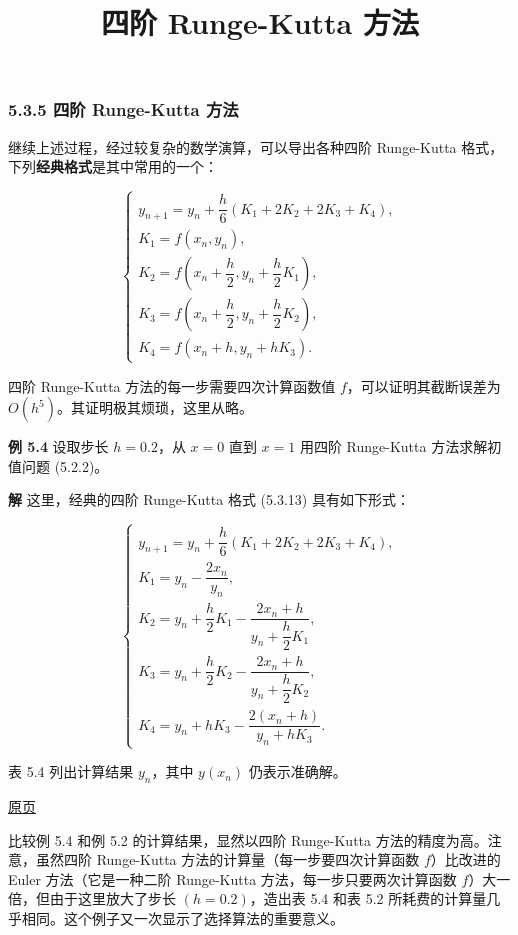 \documentclass[
  10pt,
  fontset=fandol]{ctexart}
\title{四阶 Runge-Kutta 方法}
\author{}
\date{}
\begin{document}
\maketitle

\subsubsection{5.3.5 四阶 Runge-Kutta 方法}\label{ux56dbux9636-runge-kutta-ux65b9ux6cd5}

继续上述过程，经过较复杂的数学演算，可以导出各种四阶 Runge-Kutta 格式，下列\textbf{经典格式}是其中常用的一个：

\[
\begin{cases}
y_{n+1}=y_n+\dfrac{h}{6}(K_1+2K_2+2K_3+K_4),\\
K_1=f(x_n,y_n),\\
K_2=f\left(x_n+\dfrac{h}{2},y_n+\dfrac{h}{2}K_1\right),\\
K_3=f\left(x_n+\dfrac{h}{2},y_n+\dfrac{h}{2}K_2\right),\\
K_4=f(x_n+h,y_n+hK_3).
\end{cases}\tag{5.3.13}
\]

四阶 Runge-Kutta 方法的每一步需要四次计算函数值 \(f\)，可以证明其截断误差为 \(O(h^5)\)。其证明极其烦琐，这里从略。

\textbf{例 5.4} 设取步长 \(h=0.2\)，从 \(x=0\) 直到 \(x=1\) 用四阶 Runge-Kutta 方法求解初值问题 (5.2.2)。

\textbf{解} 这里，经典的四阶 Runge-Kutta 格式 (5.3.13) 具有如下形式：

\[
\begin{cases}
y_{n+1}=y_n+\dfrac{h}{6}(K_1+2K_2+2K_3+K_4),\\
K_1=y_n-\dfrac{2x_n}{y_n},\\
K_2=y_n+\dfrac{h}{2}K_1-\dfrac{2x_n+h}{y_n+\dfrac{h}{2}K_1},\\
K_3=y_n+\dfrac{h}{2}K_2-\dfrac{2x_n+h}{y_n+\dfrac{h}{2}K_2},\\
K_4=y_n+hK_3-\dfrac{2(x_n+h)}{y_n+hK_3}.
\end{cases}
\]

表 5.4 列出计算结果 \(y_n\)，其中 \(y(x_n)\) 仍表示准确解。

\href{../../source-images/pdf-132.jpeg}{原页}

比较例 5.4 和例 5.2 的计算结果，显然以四阶 Runge-Kutta 方法的精度为高。注意，虽然四阶 Runge-Kutta 方法的计算量（每一步要四次计算函数 \(f\)）比改进的 Euler 方法（它是一种二阶 Runge-Kutta 方法，每一步只要两次计算函数 \(f\)）大一倍，但由于这里放大了步长 \((h=0.2)\)，造出表 5.4 和表 5.2 所耗费的计算量几乎相同。这个例子又一次显示了选择算法的重要意义。
\end{document}
